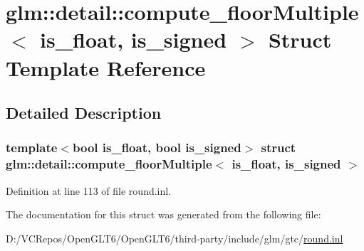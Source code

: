 \hypertarget{structglm_1_1detail_1_1compute__floor_multiple}{}\section{glm\+::detail\+::compute\+\_\+floor\+Multiple$<$ is\+\_\+float, is\+\_\+signed $>$ Struct Template Reference}
\label{structglm_1_1detail_1_1compute__floor_multiple}


\subsection{Detailed Description}
\subsubsection*{template$<$bool is\+\_\+float, bool is\+\_\+signed$>$\newline
struct glm\+::detail\+::compute\+\_\+floor\+Multiple$<$ is\+\_\+float, is\+\_\+signed $>$}



Definition at line 113 of file round.\+inl.



The documentation for this struct was generated from the following file\+:\begin{DoxyCompactItemize}
\item 
D\+:/\+V\+C\+Repos/\+Open\+G\+L\+T6/\+Open\+G\+L\+T6/third-\/party/include/glm/gtc/\mbox{\hyperlink{round_8inl}{round.\+inl}}\end{DoxyCompactItemize}
